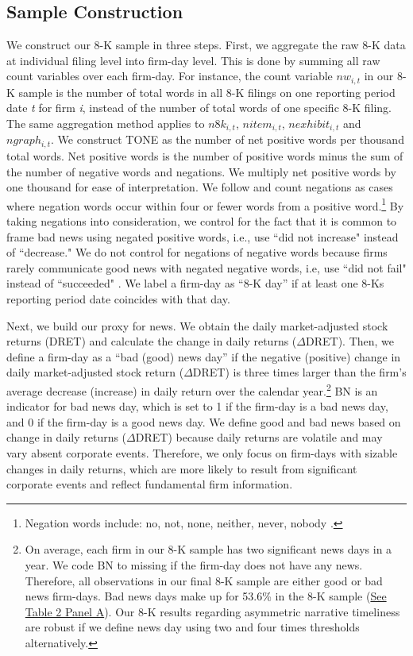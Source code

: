 \documentclass[letterpaper,12pt]{article}
\begin{document}
\begin{spacing}{1.5}
\subsection{Sample Construction} \label{sec3.3}
\noindent We construct our 8-K sample in three steps. First, we aggregate the raw 8-K data at individual filing level into firm-day level. This is done by summing all raw count variables over each firm-day. For instance, the count variable $nw_{i,t}$ in our 8-K sample is the number of total words in all 8-K filings on one reporting period date \textit{t} for firm \textit{i}, instead of the number of total words of one specific 8-K filing. The same aggregation method applies to $n8k_{i,t}$, $nitem_{i,t}$, $nexhibit_{i,t}$ and $ngraph_{i,t}$. We construct TONE as the number of net positive words per thousand total words. Net positive words is the number of positive words minus the sum of the number of negative words and negations. We multiply net positive words by one thousand for ease of interpretation. We follow  and count negations as cases where negation words occur within four or fewer words from a positive word.\footnote{Negation words include: no, not, none, neither, never, nobody \cite{tottieNegationEnglishSpeech1991}.} By taking negations into consideration, we control for the fact that it is common to frame bad news using negated positive words, i.e., use ``did not increase" instead of ``decrease." We do not control for negations of negative words because firms rarely communicate good news with negated negative words, i.e, use ``did not fail" instead of ``succeeded" \cite{loughranWhenLiabilityNot2011}. We label a firm-day as ``8-K day” if at least one 8-Ks reporting period date coincides with that day.

Next, we build our proxy for news. We obtain the daily market-adjusted stock returns (DRET) and calculate the change in daily returns ($\Delta$DRET). Then, we define a firm-day as a ``bad (good) news day” if the negative (positive) change in daily market-adjusted stock return ($\Delta$DRET) is three times larger than the firm's average decrease (increase) in daily return over the calendar year.\footnote{On average, each firm in our 8-K sample has two significant news days in a year. We code BN to missing if the firm-day does not have any news. Therefore, all observations in our final 8-K sample are either good or bad news firm-days. Bad news days make up for 53.6\% in the 8-K sample (\hyperref[T2PA]{See Table 2 Panel A}). Our 8-K results regarding asymmetric narrative timeliness are robust if we define news day using two and four times thresholds alternatively.} BN is an indicator for bad news day, which is set to 1 if the firm-day is a bad news day, and 0 if the firm-day is a good news day. We define good and bad news based on change in daily returns ($\Delta$DRET) because daily returns are volatile and may vary absent corporate events. Therefore, we only focus on firm-days with sizable changes in daily returns, which are more likely to result from significant corporate events and reflect fundamental firm information.


\end{spacing}
\end{document}
